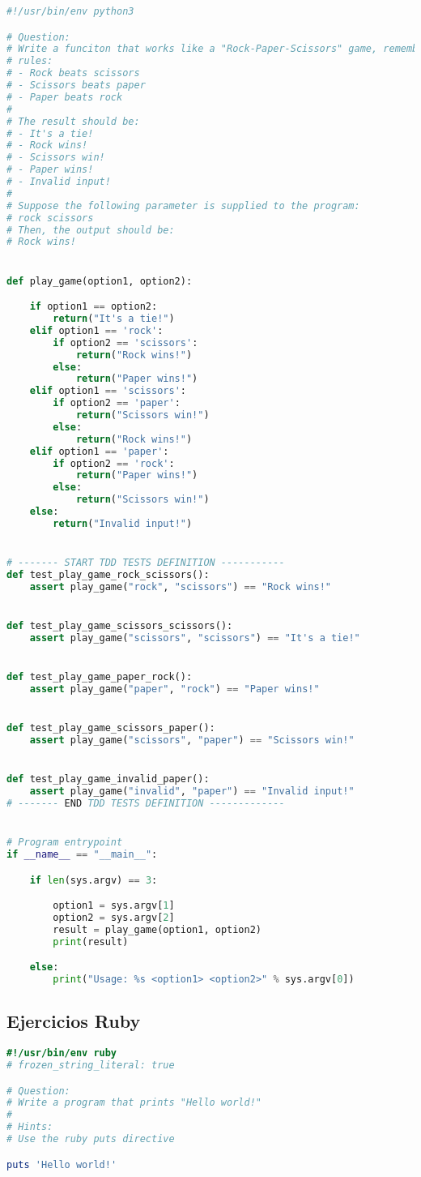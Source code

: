 \begin{lstlisting}[language=python,caption={exercise\_5.py},captionpos=b]
#!/usr/bin/env python3

# Question:
# Write a funciton that works like a "Rock-Paper-Scissors" game, remember the
# rules:
# - Rock beats scissors
# - Scissors beats paper
# - Paper beats rock
#
# The result should be:
# - It's a tie!
# - Rock wins!
# - Scissors win!
# - Paper wins!
# - Invalid input!
#
# Suppose the following parameter is supplied to the program:
# rock scissors
# Then, the output should be:
# Rock wins!


def play_game(option1, option2):

    if option1 == option2:
        return("It's a tie!")
    elif option1 == 'rock':
        if option2 == 'scissors':
            return("Rock wins!")
        else:
            return("Paper wins!")
    elif option1 == 'scissors':
        if option2 == 'paper':
            return("Scissors win!")
        else:
            return("Rock wins!")
    elif option1 == 'paper':
        if option2 == 'rock':
            return("Paper wins!")
        else:
            return("Scissors win!")
    else:
        return("Invalid input!")


# ------- START TDD TESTS DEFINITION -----------
def test_play_game_rock_scissors():
    assert play_game("rock", "scissors") == "Rock wins!"


def test_play_game_scissors_scissors():
    assert play_game("scissors", "scissors") == "It's a tie!"


def test_play_game_paper_rock():
    assert play_game("paper", "rock") == "Paper wins!"


def test_play_game_scissors_paper():
    assert play_game("scissors", "paper") == "Scissors win!"


def test_play_game_invalid_paper():
    assert play_game("invalid", "paper") == "Invalid input!"
# ------- END TDD TESTS DEFINITION -------------


# Program entrypoint
if __name__ == "__main__":

    if len(sys.argv) == 3:

        option1 = sys.argv[1]
        option2 = sys.argv[2]
        result = play_game(option1, option2)
        print(result)

    else:
        print("Usage: %s <option1> <option2>" % sys.argv[0])
\end{lstlisting}

\subsection{Ejercicios Ruby}
\begin{lstlisting}[language=ruby,caption={exercise\_1.rb},captionpos=b]
#!/usr/bin/env ruby
# frozen_string_literal: true

# Question:
# Write a program that prints "Hello world!"
#
# Hints:
# Use the ruby puts directive

puts 'Hello world!'
\end{lstlisting}


